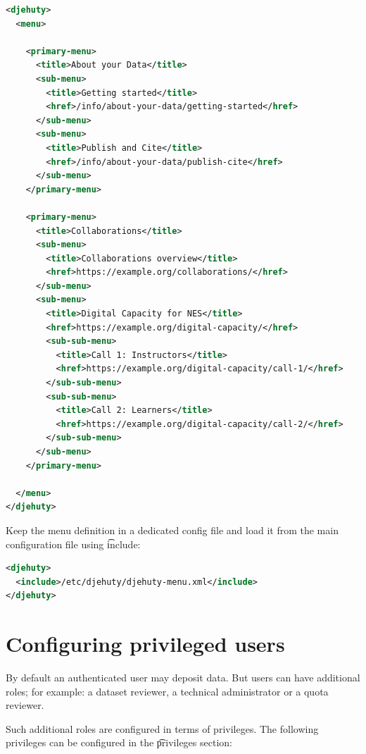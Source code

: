 \begin{lstlisting}[language=XML]
<djehuty>
  <menu>

    <primary-menu>
      <title>About your Data</title>
      <sub-menu>
        <title>Getting started</title>
        <href>/info/about-your-data/getting-started</href>
      </sub-menu>
      <sub-menu>
        <title>Publish and Cite</title>
        <href>/info/about-your-data/publish-cite</href>
      </sub-menu>
    </primary-menu>

    <primary-menu>
      <title>Collaborations</title>
      <sub-menu>
        <title>Collaborations overview</title>
        <href>https://example.org/collaborations/</href>
      </sub-menu>
      <sub-menu>
        <title>Digital Capacity for NES</title>
        <href>https://example.org/digital-capacity/</href>
        <sub-sub-menu>
          <title>Call 1: Instructors</title>
          <href>https://example.org/digital-capacity/call-1/</href>
        </sub-sub-menu>
        <sub-sub-menu>
          <title>Call 2: Learners</title>
          <href>https://example.org/digital-capacity/call-2/</href>
        </sub-sub-menu>
      </sub-menu>
    </primary-menu>

  </menu>
</djehuty>
\end{lstlisting}

  Keep the menu definition in a dedicated config file and load it
  from the main configuration file using \t{include}:

\begin{lstlisting}[language=XML]
<djehuty>
  <include>/etc/djehuty/djehuty-menu.xml</include>
</djehuty>
\end{lstlisting}

\section{Configuring privileged users}

  By default an authenticated user may deposit data. But users can have
  additional roles; for example: a dataset reviewer, a technical
  administrator or a quota reviewer.

  Such additional roles are configured in terms of privileges.  The
  following privileges can be configured in the \t{privileges} section:

